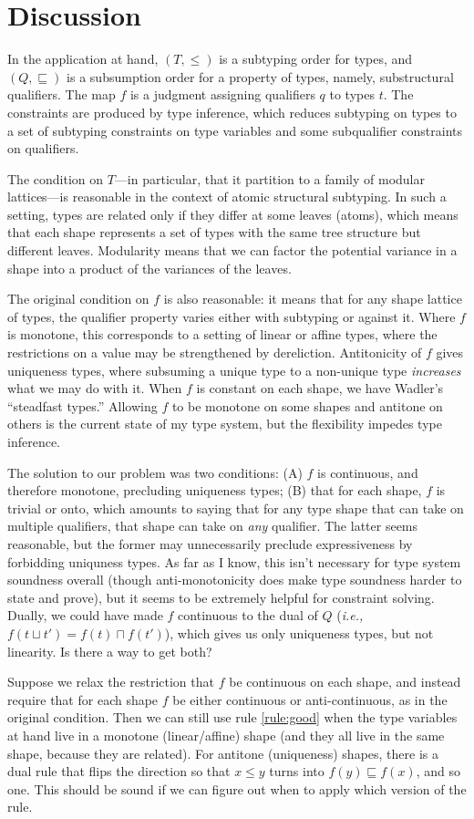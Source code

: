 \documentclass[11pt]{article}
\begin{document}
\section*{Discussion}

In the application at hand,
$(T, ≤)$ is a subtyping order for types, and
$(Q, ⊑)$ is a subsumption order for a property of types, namely,
substructural qualifiers.  The map $f$ is a judgment assigning
qualifiers $q$ to types $t$.  The constraints are produced by type
inference, which reduces subtyping on types to a set of subtyping
constraints on type variables and some subqualifier constraints on
qualifiers.

The condition on $T$---in particular, that it partition to a family of
modular lattices---is reasonable in the context of atomic structural
subtyping.  In such a setting, types are related only if they differ at
some leaves (atoms), which means that each shape represents a set of
types with the same tree structure but different leaves.  Modularity
means that we can factor the potential variance in a shape into a
product of the variances of the leaves.

The original condition on $f$ is also reasonable: it means that for any
shape lattice of types, the qualifier property varies either with
subtyping or against it.  Where $f$ is monotone, this corresponds to a
setting of linear or affine types, where the restrictions on a value may
be strengthened by dereliction.  Antitonicity of $f$ gives uniqueness
types, where subsuming a unique type to a non-unique type
\emph{increases} what we may do with it.  When $f$ is constant on each
shape, we have Wadler's ``steadfast types.'' Allowing $f$ to be monotone
on some shapes and antitone on others is the current state of my type
system, but the flexibility impedes type inference.

The solution to our problem was two conditions: (A) $f$ is continuous,
and therefore monotone, precluding uniqueness types; (B) that for each
shape, $f$ is trivial or onto, which amounts to saying that for any type
shape that can take on multiple qualifiers, that shape can take on
\emph{any} qualifier. The latter seems reasonable, but the former may
unnecessarily preclude expressiveness by forbidding uniquness types.  As
far as I know, this isn't necessary for type system soundness overall
(though anti-monotonicity does make type soundness harder to state and
prove), but it seems to be extremely helpful for constraint solving.
Dually, we could have made $f$ continuous to the dual of $Q$
(\emph{i.e.,} $f(t ⊔ t') = f(t) ⊓ f(t')$),
which gives us only uniqueness types, but not
linearity.  Is there a way to get both?

Suppose we relax the restriction that $f$ be continuous on each shape,
and instead require that for each shape $f$ be either continuous or
anti-continuous, as in the original condition.  Then we can still use
rule \eqref{rule:good} when the type variables at hand live in a
monotone (linear/affine) shape (and they all live in the same shape,
because they are related). For antitone (uniqueness) shapes, there is a
dual rule that flips the direction so that $x ≤ y$ turns into $f(y) ⊑
f(x)$, and so one.  This should be sound if we can figure out when to
apply which version of the rule.
\end{document}
